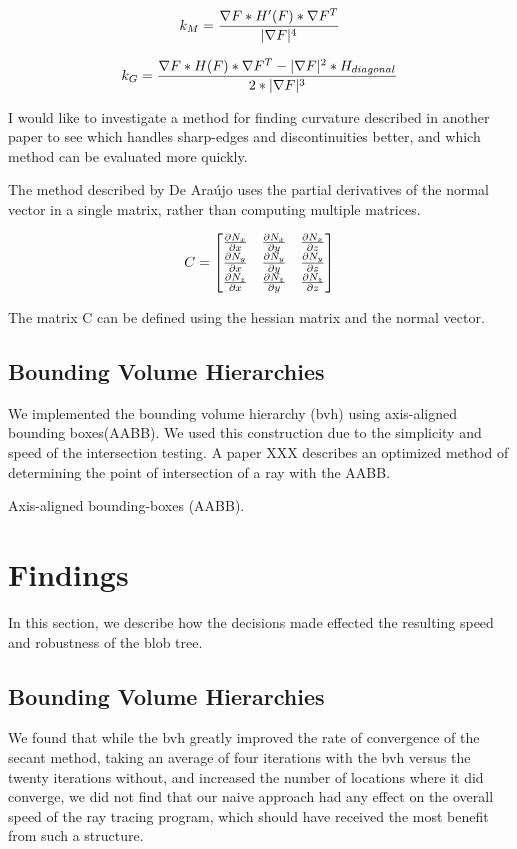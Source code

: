 \documentclass[conference]{acmsiggraph}
\begin{document}
$$k_M = {\nabla F * H'(F) * \nabla F^T \over |\nabla F|^4}$$

$$k_G = {\nabla F * H(F) * \nabla F^T - |\nabla F|^2 * H_{diagonal} \over 2 *
|\nabla F|^3}$$

I would like to investigate a method for finding curvature described in another
paper\cite{DeAraujo2004} to see which handles sharp-edges and discontinuities
better, and which method can be evaluated more quickly.

The method described by De Ara\'{u}jo uses the partial derivatives of the
normal vector in a single matrix, rather than computing multiple matrices.

$$
C=
\begin{bmatrix}
	{\partial N_x \over \partial x}&{\partial N_x \over \partial y}&{\partial N_x \over \partial z}\\
	{\partial N_y \over \partial x}&{\partial N_y \over \partial y}&{\partial N_y \over \partial z}\\
	{\partial N_z \over \partial x}&{\partial N_z \over \partial y}&{\partial N_z \over \partial z}
\end{bmatrix}
$$

The matrix C can be defined using the hessian matrix and the normal vector.

\subsection{Bounding Volume Hierarchies}
We implemented the bounding volume hierarchy (bvh) using axis-aligned bounding
boxes(AABB). We used this construction due to the simplicity and speed of the
intersection testing. A paper XXX describes an optimized method of determining
the point of intersection of a ray with the AABB.

Axis-aligned bounding-boxes (AABB).

\section{Findings}
In this section, we describe how the decisions made effected the resulting
speed and robustness of the blob tree.

\subsection{Bounding Volume Hierarchies}
We found that while the bvh greatly improved the rate of convergence of the
secant method, taking an average of four iterations with the bvh versus the
twenty iterations without, and increased the number of locations where it did
converge, we did not find that our naive approach had any effect on the overall
speed of the ray tracing program, which should have received the most benefit
from such a structure.




\end{document}
